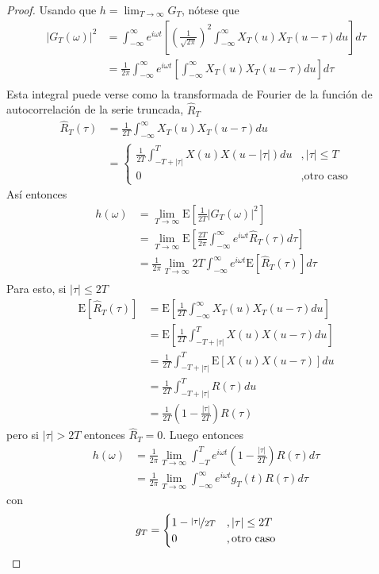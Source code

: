 \documentclass[12pt,letterpaper,draft]{book}
\newcommand{\intR}{\int_{-\infty}^{\infty}}
\newcommand{\E}[1]{\mathrm{E}\left[ #1 \right]}
\newcommand{\abso}[1]{\left| #1 \right|}
\begin{document}
\begin{proof}
Usando que $h = \lim_{T\rightarrow\infty} G_T$, nótese que
\begin{align*}
\abso{G_T(\omega)}^{2} &= 
\intR e^{i \omega t} \left[ \left(\frac{1}{\sqrt{2\pi}} \right)^{2} \intR X_T(u) X_T(u-\tau) du \right] d\tau \\
&=
\frac{1}{2\pi} \intR e^{i \omega t} \left[ \intR X_T(u) X_T(u-\tau) du \right] d\tau \\
\end{align*}
Esta integral puede verse como la transformada de Fourier de la función de autocorrelación de la serie truncada, $\widehat{R}_T$
\begin{align*}
\widehat{R}_T (\tau) &= \frac{1}{2T} \intR X_T(u) X_T(u-\tau) du \\
&= \begin{cases}
\frac{1}{2T} \int_{-T+\abso{\tau}}^{T} X(u) X(u-\abso{\tau}) du &, \abso{\tau} \leq T \\
0 &, \text{otro caso}
\end{cases}
\end{align*}
Así entonces
\begin{align*}
h(\omega) &=
\lim_{T\rightarrow \infty} \E{\frac{1}{2T} \abso{G_T(\omega)}^{2}} \\
&=
\lim_{T\rightarrow \infty}
\E{\frac{2T}{2\pi} \intR e^{i \omega t} \widehat{R}_T(\tau) d\tau }\\
&=
\frac{1}{2\pi}
\lim_{T\rightarrow \infty}
2T \intR e^{i \omega t} \E{\widehat{R}_T(\tau)} d\tau\\
\end{align*}
Para esto, si $\abso{\tau} \leq 2T$
\begin{align*}
\E{\widehat{R}_T(\tau)} &=
\E{\frac{1}{2T} \intR X_T(u) X_T(u-\tau) du} \\
&=
\E{ \frac{1}{2T} \int_{-T+\abso{\tau}}^{T} X(u) X(u-\tau) du } \\
&=
\frac{1}{2T} \int_{-T+\abso{\tau}}^{T} \E{X(u) X(u-\tau)} du \\
&=
\frac{1}{2T} \int_{-T+\abso{\tau}}^{T} R(\tau) du \\
&=
\frac{1}{2T} \left( 1 - \frac{\abso{\tau}}{2T} \right) R(\tau)
\end{align*}
pero si $\abso{\tau}>2T$ entonces $\widehat{R}_T = 0$. Luego entonces
\begin{align*}
h(\omega) &=
\frac{1}{2\pi} \lim_{T\rightarrow \infty}
\int_{-T}^{T} e^{i \omega t} \left( 1 - \frac{\abso{\tau}}{2T} \right) R(\tau) d\tau\\
&=
\frac{1}{2\pi} \lim_{T\rightarrow \infty}
\intR e^{i \omega t} g_T(t) R(\tau) d\tau
\end{align*}
con
\begin{equation}
g_T = \begin{cases}
1 - \nicefrac{\abso{\tau}}{2T} &, \abso{\tau} \leq 2T \\
0 &, \text{otro caso}
\end{cases}
\end{equation}


\end{proof}
\end{document}

